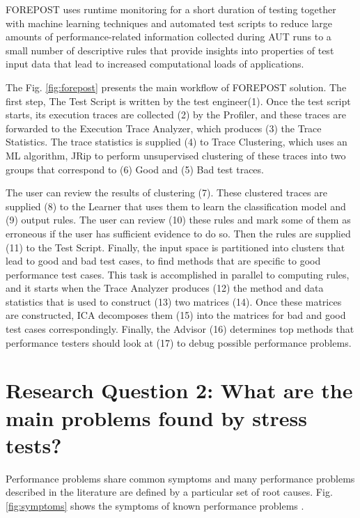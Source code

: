 \documentclass{report}
\begin{document}
FOREPOST uses runtime monitoring for a short duration of testing together with machine learning techniques and automated test scripts to reduce large amounts of performance-related information collected during AUT runs to a small number of descriptive rules that provide insights into properties of test input data that lead to increased computational loads of applications.

The Fig. \ref{fig:forepost} presents the main workflow of FOREPOST solution. The first step,  The Test Script is written  by the test engineer(1). Once the test script starts, its execution traces are collected (2) by the Profiler, and these traces are forwarded to the Execution Trace Analyzer, which produces (3) the Trace Statistics. The trace statistics is supplied (4) to Trace Clustering, which uses an ML algorithm, JRip to perform unsupervised clustering of these traces into two groups that correspond to (6) Good and (5) Bad test traces.

The user can review the results of clustering (7). These clustered traces are supplied (8) to the Learner that uses them to learn the classification model and (9) output rules. The user can review (10) these rules and mark some of them as erroneous if the user has sufficient evidence to do so. Then the rules are supplied (11) to the Test Script. Finally, the input space is partitioned into clusters that lead to good and bad test cases, to find methods that are specific to good performance test cases. This task is accomplished in parallel to computing rules, and it starts when the Trace Analyzer produces (12) the method and data statistics that is used to construct (13) two matrices (14). Once these matrices are constructed, ICA decomposes them (15) into the matrices for bad and good test cases correspondingly. Finally, the Advisor (16) determines top methods that performance testers should look at (17) to debug possible performance problems.




\section{Research Question 2: What are the main problems found by stress tests?}

 Performance problems share common symptoms and many performance problems described in the literature are defined by a particular set of root causes. Fig. \ref{fig:symptoms}  shows the symptoms of known performance problems \cite{Wert2013a}.
\end{document}
